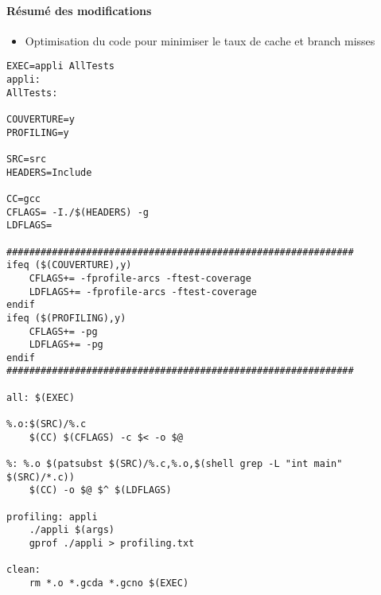 \documentclass{article}
\begin{document}
\paragraph{Résumé des modifications}
\begin{itemize}
\item Optimisation du code pour minimiser le taux de cache et branch misses
\end{itemize}


\newpage
\appendix
  \begin{lstlisting}
EXEC=appli AllTests
appli:
AllTests:

COUVERTURE=y
PROFILING=y

SRC=src
HEADERS=Include

CC=gcc
CFLAGS= -I./$(HEADERS) -g
LDFLAGS=

#############################################################
ifeq ($(COUVERTURE),y)
	CFLAGS+= -fprofile-arcs -ftest-coverage 
	LDFLAGS+= -fprofile-arcs -ftest-coverage
endif
ifeq ($(PROFILING),y)
	CFLAGS+= -pg
	LDFLAGS+= -pg
endif
#############################################################

all: $(EXEC)

%.o:$(SRC)/%.c
	$(CC) $(CFLAGS) -c $< -o $@

%: %.o $(patsubst $(SRC)/%.c,%.o,$(shell grep -L "int main" $(SRC)/*.c))
	$(CC) -o $@ $^ $(LDFLAGS)

profiling: appli
	./appli $(args)
	gprof ./appli > profiling.txt

clean:
	rm *.o *.gcda *.gcno $(EXEC)


  \end{lstlisting}
\end{document}
